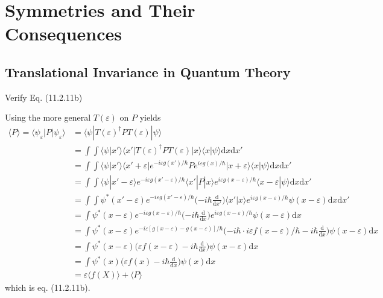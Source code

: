 \documentclass[../principles-of-quantum-mechanics.tex]{subfiles}
\begin{document}
	\printanswers
	
	\setcounter{section}{10}
	\section{Symmetries and Their Consequences}

	\begin{questions}
		\setcounter{subsection}{1}
		\setcounter{question}{0}
		\subsection{Translational Invariance in Quantum Theory}
		\question Verify Eq. (11.2.11b)
		
		\begin{solution}
			Using the more general $T(\varepsilon)$ on $P$ yields
			\begin{align*}
				\langle P\rangle = \langle\psi_\varepsilon|P|\psi_\varepsilon\rangle &= \langle \psi|T(\varepsilon)^\dagger P T(\varepsilon)|\psi\rangle \\
				&= \int\!\!\!\!\int\langle \psi|x'\rangle\langle x'|T(\varepsilon)^\dagger P T(\varepsilon)|x\rangle\langle x|\psi\rangle\mathrm{d}x\mathrm{d}x' \\
				&= \int\!\!\!\!\int \langle \psi|x'\rangle \langle x' + \varepsilon|e^{-i\varepsilon g(x')/\hbar}Pe^{i\varepsilon g(x)/\hbar}|x + \varepsilon\rangle\langle x|\psi\rangle\mathrm{d}x\mathrm{d}x' \\
				&= \int\!\!\!\!\int \langle \psi|x' - \varepsilon\rangle e^{-i\varepsilon g(x' - \varepsilon)/\hbar}\langle x'|P|x\rangle e^{i\varepsilon g(x - \varepsilon)/\hbar}\langle x - \varepsilon|\psi\rangle\mathrm{d}x\mathrm{d}x' \\
				&= \int\!\!\!\!\int \psi^*(x' - \varepsilon) e^{-i\varepsilon g(x' - \varepsilon)/\hbar}\Big({-i\hbar\frac{\mathrm{d}}{\mathrm{d}x'}}\Big)\langle x'|x\rangle e^{i\varepsilon g(x - \varepsilon)/\hbar}\psi(x - \varepsilon)\mathrm{d}x\mathrm{d}x' \\
				&= \int \psi^*(x - \varepsilon) e^{-i\varepsilon g(x - \varepsilon)/\hbar}\Big({-i\hbar\frac{\mathrm{d}}{\mathrm{d}x}}\Big) e^{i\varepsilon g(x - \varepsilon)/\hbar}\psi(x - \varepsilon)\mathrm{d}x \\
				&= \int \psi^*(x - \varepsilon) e^{-i\varepsilon [g(x - \varepsilon) - g(x - \varepsilon)]/\hbar}\Big({-i\hbar\cdot i\varepsilon f(x - \varepsilon)/\hbar} - i\hbar\frac{\mathrm{d}}{\mathrm{d}x}\Big) \psi(x - \varepsilon)\mathrm{d}x \\
				&= \int \psi^*(x - \varepsilon)\Big({\varepsilon f(x - \varepsilon)} - i\hbar\frac{\mathrm{d}}{\mathrm{d}x}\Big) \psi(x - \varepsilon)\mathrm{d}x \\
				&= \int \psi^*(x)\Big({\varepsilon f(x)} - i\hbar\frac{\mathrm{d}}{\mathrm{d}x}\Big) \psi(x)\mathrm{d}x \\
				&= \varepsilon\langle f(X)\rangle + \langle P\rangle
			\end{align*}
			which is eq. (11.2.11b).
		\end{solution}
		

\end{questions}
\end{document}
